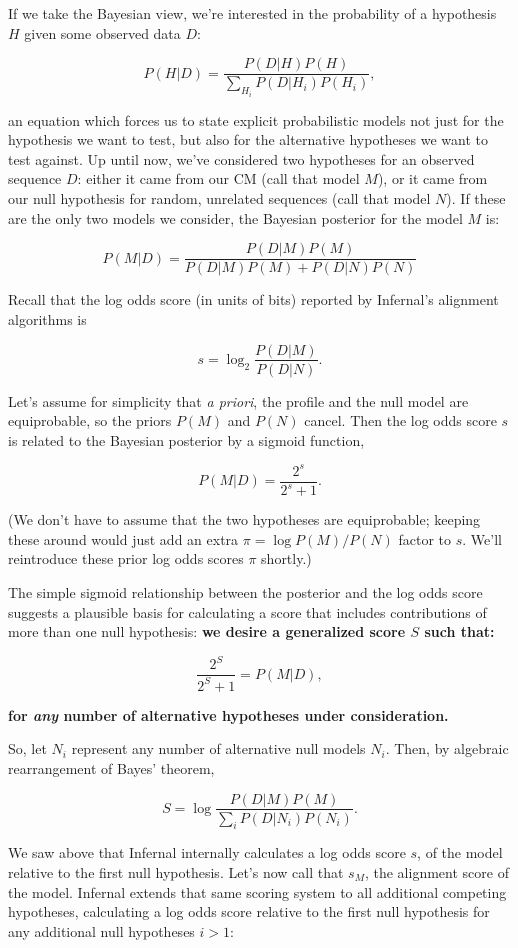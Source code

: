 If we take the Bayesian view, we're interested in the probability of a
hypothesis $H$ given some observed data $D$:

\[
   P(H | D) = \frac{P(D | H) P(H)}{\sum_{H_i} P(D | H_i) P(H_i)},
\]

an equation which forces us to state explicit probabilistic models not
just for the hypothesis we want to test, but also for the alternative
hypotheses we want to test against. Up until now, we've considered two
hypotheses for an observed sequence $D$: either it came from our
CM (call that model $M$), or it came from our null hypothesis
for random, unrelated sequences (call that model $N$). If these are
the only two models we consider, the Bayesian posterior for the model
$M$ is:

\[
   P(M | D) = \frac{P(D | M) P(M)}{P(D | M) P(M) + P(D | N) P(N)}
\]

Recall that the log odds score (in units of bits) reported by
Infernal's alignment algorithms is

\[
  s = \log_2 \frac{P(D | M)}{P(D | N)}.
\]

Let's assume for simplicity that \emph{a priori}, the profile and the
null model are equiprobable, so the priors $P(M)$ and $P(N)$
cancel. Then the log odds score $s$ is related to the Bayesian
posterior by a sigmoid function,

\[
  P(M | D) = \frac{2^s}{2^s + 1}.
\]

(We don't have to assume that the two hypotheses are equiprobable;
keeping these around would just add an extra $\pi = \log P(M) / P(N)$
factor to $s$. We'll reintroduce these prior log odds scores $\pi$
shortly.)

The simple sigmoid relationship between the posterior and the log odds
score suggests a plausible basis for calculating a score that includes
contributions of more than one null hypothesis: \textbf{we desire a
generalized score $S$ such that:}

\[
  \frac{2^S}{2^S + 1} = P(M | D),
\]

\textbf{for \emph{any} number of alternative hypotheses under consideration.}

So, let $N_i$ represent any number of alternative null models
$N_i$. Then, by algebraic rearrangement of Bayes' theorem,

\[
   S = \log \frac{P(D | M) P(M)}{ \sum_{i} P(D | N_i) P(N_i)}. 
\]

We saw above that Infernal internally calculates a log odds score $s$, of
the model relative to the first null hypothesis. Let's now call that
$s_M$, the alignment score of the model. Infernal extends that same
scoring system to all additional competing hypotheses, calculating a
log odds score relative to the first null hypothesis for any
additional null hypotheses $i > 1$:

